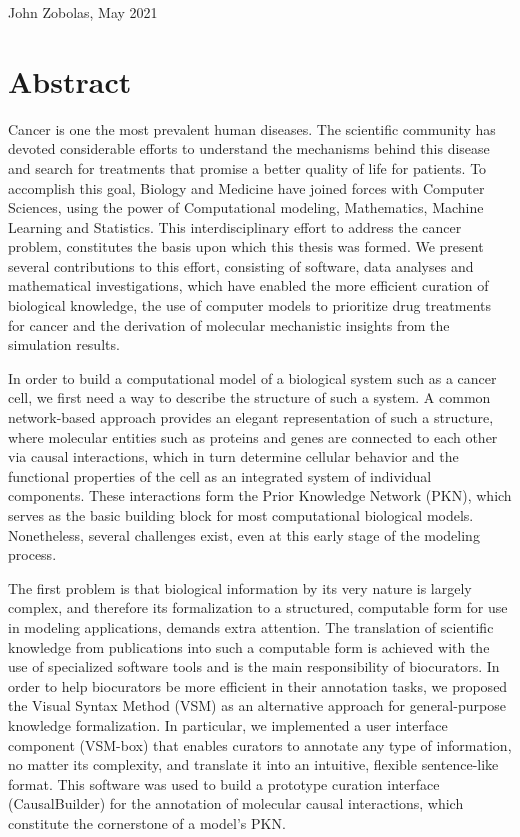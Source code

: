 \documentclass[
  12pt,
]{book}
\newenvironment{right-align}{
  \begin{flushright}}
 {\end{flushright}}
\begin{document}
\begin{right-align}
John Zobolas,
May 2021

\end{right-align}

\hypertarget{abstract}{%
\chapter*{Abstract}\label{abstract}}

\vspace{-30pt}

\indent

Cancer is one the most prevalent human diseases.
The scientific community has devoted considerable efforts to understand the mechanisms behind this disease and search for treatments that promise a better quality of life for patients.
To accomplish this goal, Biology and Medicine have joined forces with Computer Sciences, using the power of Computational modeling, Mathematics, Machine Learning and Statistics.
This interdisciplinary effort to address the cancer problem, constitutes the basis upon which this thesis was formed.
We present several contributions to this effort, consisting of software, data analyses and mathematical investigations, which have enabled the more efficient curation of biological knowledge, the use of computer models to prioritize drug treatments for cancer and the derivation of molecular mechanistic insights from the simulation results.

In order to build a computational model of a biological system such as a cancer cell, we first need a way to describe the structure of such a system.
A common network-based approach provides an elegant representation of such a structure, where molecular entities such as proteins and genes are connected to each other via causal interactions, which in turn determine cellular behavior and the functional properties of the cell as an integrated system of individual components.
These interactions form the Prior Knowledge Network (PKN), which serves as the basic building block for most computational biological models. Nonetheless, several challenges exist, even at this early stage of the modeling process.

The first problem is that biological information by its very nature is largely complex, and therefore its formalization to a structured, computable form for use in modeling applications, demands extra attention.
The translation of scientific knowledge from publications into such a computable form is achieved with the use of specialized software tools and is the main responsibility of biocurators.
In order to help biocurators be more efficient in their annotation tasks, we proposed the Visual Syntax Method (VSM) as an alternative approach for general-purpose knowledge formalization.
In particular, we implemented a user interface component (VSM-box) that enables curators to annotate any type of information, no matter its complexity, and translate it into an intuitive, flexible sentence-like format.
This software was used to build a prototype curation interface (CausalBuilder) for the annotation of molecular causal interactions, which constitute the cornerstone of a model's PKN.
\end{document}
